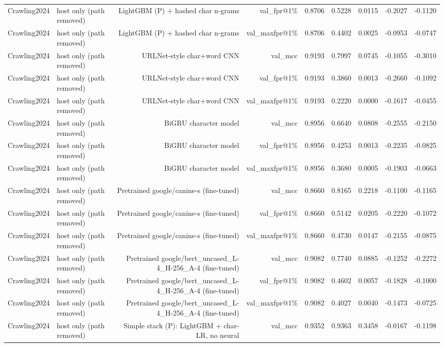 \begin{table}[t]
\begin{tabular}{llrrrrrrr}
Crawling2024 & host only (path removed) & LightGBM (P) + hashed char n-grams & val\_fpr@1\% & 0.8706 & 0.5228 & 0.0115 & -0.2027 & -0.1120 \\
Crawling2024 & host only (path removed) & LightGBM (P) + hashed char n-grams & val\_maxfpr@1\% & 0.8706 & 0.4402 & 0.0025 & -0.0953 & -0.0747 \\
Crawling2024 & host only (path removed) & URLNet-style char+word CNN & val\_mcc & 0.9193 & 0.7997 & 0.0745 & -0.1055 & -0.3010 \\
Crawling2024 & host only (path removed) & URLNet-style char+word CNN & val\_fpr@1\% & 0.9193 & 0.3860 & 0.0013 & -0.2660 & -0.1092 \\
Crawling2024 & host only (path removed) & URLNet-style char+word CNN & val\_maxfpr@1\% & 0.9193 & 0.2220 & 0.0000 & -0.1617 & -0.0455 \\
Crawling2024 & host only (path removed) & BiGRU character model & val\_mcc & 0.8956 & 0.6640 & 0.0808 & -0.2555 & -0.2150 \\
Crawling2024 & host only (path removed) & BiGRU character model & val\_fpr@1\% & 0.8956 & 0.4253 & 0.0013 & -0.2235 & -0.0825 \\
Crawling2024 & host only (path removed) & BiGRU character model & val\_maxfpr@1\% & 0.8956 & 0.3680 & 0.0005 & -0.1903 & -0.0663 \\
Crawling2024 & host only (path removed) & Pretrained google/canine-s (fine-tuned) & val\_mcc & 0.8660 & 0.8165 & 0.2218 & -0.1100 & -0.1165 \\
Crawling2024 & host only (path removed) & Pretrained google/canine-s (fine-tuned) & val\_fpr@1\% & 0.8660 & 0.5142 & 0.0205 & -0.2220 & -0.1072 \\
Crawling2024 & host only (path removed) & Pretrained google/canine-s (fine-tuned) & val\_maxfpr@1\% & 0.8660 & 0.4730 & 0.0147 & -0.2155 & -0.0875 \\
Crawling2024 & host only (path removed) & Pretrained google/bert\_uncased\_L-4\_H-256\_A-4 (fine-tuned) & val\_mcc & 0.9082 & 0.7740 & 0.0885 & -0.1252 & -0.2272 \\
Crawling2024 & host only (path removed) & Pretrained google/bert\_uncased\_L-4\_H-256\_A-4 (fine-tuned) & val\_fpr@1\% & 0.9082 & 0.4602 & 0.0057 & -0.1828 & -0.1000 \\
Crawling2024 & host only (path removed) & Pretrained google/bert\_uncased\_L-4\_H-256\_A-4 (fine-tuned) & val\_maxfpr@1\% & 0.9082 & 0.4027 & 0.0040 & -0.1473 & -0.0725 \\
Crawling2024 & host only (path removed) & Simple stack (P): LightGBM + char-LR, no neural & val\_mcc & 0.9352 & 0.9363 & 0.3458 & -0.0167 & -0.1198 \\

\end{tabular}
\end{table}
